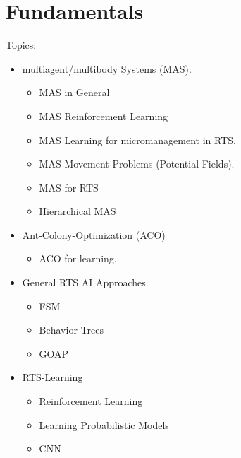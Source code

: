 
\chapter{Fundamentals}
\label{ch:Fundamentals}

Topics:
\begin{itemize}[noitemsep,nolistsep]
	\item multiagent/multibody Systems (MAS).
	\begin{itemize}[noitemsep,nolistsep]
		\item MAS in General
		\item MAS Reinforcement Learning
		\item MAS Learning for micromanagement in RTS.
		\item MAS Movement Problems (Potential Fields).
		\item MAS for RTS
		\item Hierarchical MAS
	\end{itemize}
	\item Ant-Colony-Optimization (ACO)
	\begin{itemize}[noitemsep,nolistsep]
		\item ACO for learning.
	\end{itemize}
	\item General RTS AI Approaches.
	\begin{itemize}[noitemsep,nolistsep]
		\item FSM
		\item Behavior Trees
		\item GOAP
	\end{itemize}
	\item RTS-Learning
	\begin{itemize}[noitemsep,nolistsep]
		\item Reinforcement Learning
		\item Learning Probabilistic Models
		\item CNN
	\end{itemize}
\end{itemize}
